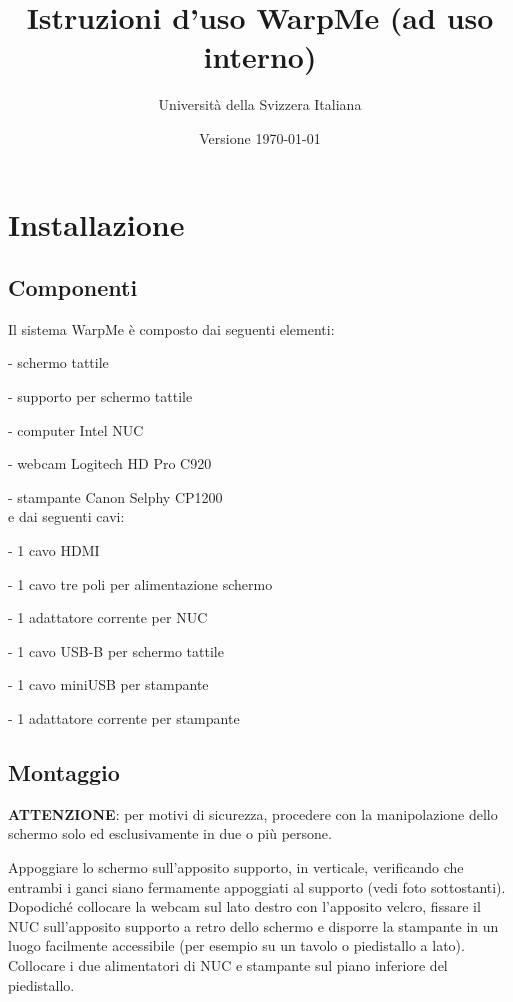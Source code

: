 \documentclass[12pt]{article}
\title{Istruzioni d'uso WarpMe (ad uso interno)}
\author{Università della Svizzera Italiana}
\date{Versione \today}
\begin{document}
\maketitle
\tableofcontents
\newpage


\section{Installazione}\label{installation}	

	\subsection{Componenti}
	
		Il sistema WarpMe è composto dai seguenti elementi:
		
		- schermo tattile
		
		- supporto per schermo tattile
		
		- computer Intel NUC
		
		- webcam Logitech HD Pro C920
		
		- stampante Canon Selphy CP1200\\
		
		e dai seguenti cavi:
		
		- 1 cavo HDMI
		
		- 1 cavo tre poli per alimentazione schermo
		
		- 1 adattatore corrente per NUC
		
		- 1 cavo USB-B per schermo tattile
		
		- 1 cavo miniUSB per stampante
		
		- 1 adattatore corrente per stampante
		
		
	\subsection{Montaggio}
	
		\textbf{ATTENZIONE}: per motivi di sicurezza, procedere con la manipolazione dello schermo solo ed esclusivamente in due o più persone.
		
		Appoggiare lo schermo sull'apposito supporto, in verticale, verificando che entrambi i ganci siano fermamente appoggiati al supporto (vedi foto sottostanti). Dopodiché collocare la webcam sul lato destro con l'apposito velcro, fissare il NUC sull'apposito supporto a retro dello schermo e disporre la stampante in un luogo facilmente accessibile (per esempio su un tavolo o piedistallo a lato). Collocare i due alimentatori di NUC e stampante sul piano inferiore del piedistallo.
		
\end{document}
